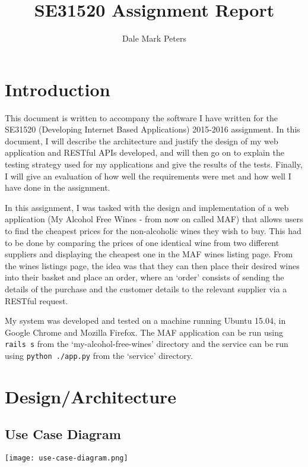 \documentclass[a4paper,12pt,hidelinks]{report}
\title{SE31520 Assignment Report}
\author{Dale Mark Peters}
\begin{document}
\maketitle

\tableofcontents
\chapter{Introduction}
    This document is written to accompany the software I have written for the SE31520 (Developing Internet Based Applications) 2015-2016 assignment. In this
    document, I will describe the architecture and justify the design of my web application and RESTful APIs developed, and will then go on
    to explain the testing strategy used for my applications and give the results of the tests. Finally, I will give an evaluation of how well the requirements
    were met and how well I have done in the assignment.

    In this assignment, I was tasked with the design and implementation of a web application (My Alcohol Free Wines - from now on called MAF) that allows users to find the cheapest prices
    for the non-alcoholic wines they wish to buy. This had to be done by comparing the prices of one identical wine from two different suppliers and displaying the
    cheapest one in the MAF wines listing page. From the wines listings page, the idea was that they can then place their desired wines into their basket and place
    an order, where an `order' consists of sending the details of the purchase and the customer details to the relevant supplier via a RESTful request.

    My system was developed and tested on a machine running Ubuntu 15.04, in Google Chrome and Mozilla Firefox. The MAF application can be run using \texttt{rails s} from
    the `my-alcohol-free-wines' directory and the service can be run using \texttt{python ./app.py} from the `service' directory.

\chapter{Design/Architecture}
    \section{Use Case Diagram}
    \begin{center}
        \texttt{[image: use-case-diagram.png]}
    \end{center}
\end{document}
